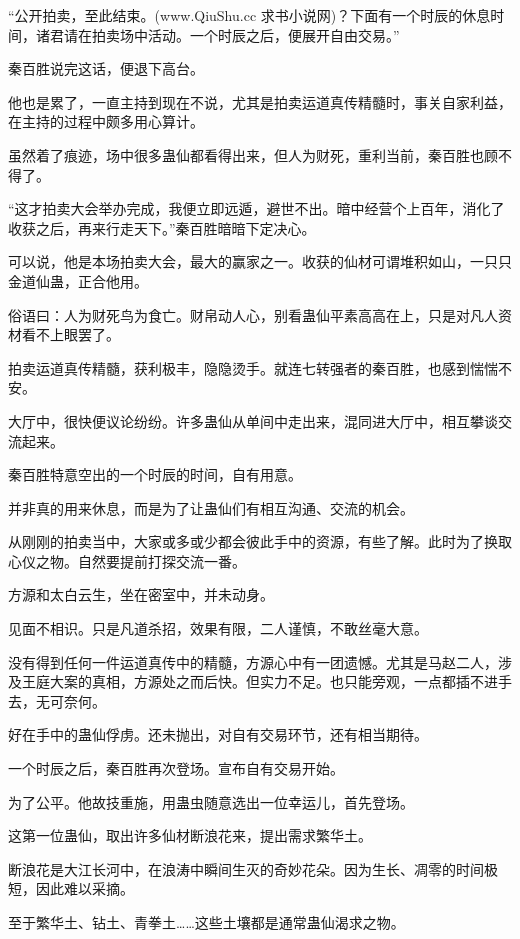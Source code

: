 
\begin{this_body}

“公开拍卖，至此结束。(www.QiuShu.cc 求书小说网)？下面有一个时辰的休息时间，诸君请在拍卖场中活动。一个时辰之后，便展开自由交易。”

秦百胜说完这话，便退下高台。

他也是累了，一直主持到现在不说，尤其是拍卖运道真传精髓时，事关自家利益，在主持的过程中颇多用心算计。

虽然着了痕迹，场中很多蛊仙都看得出来，但人为财死，重利当前，秦百胜也顾不得了。

“这才拍卖大会举办完成，我便立即远遁，避世不出。暗中经营个上百年，消化了收获之后，再来行走天下。”秦百胜暗暗下定决心。

可以说，他是本场拍卖大会，最大的赢家之一。收获的仙材可谓堆积如山，一只只金道仙蛊，正合他用。

俗语曰：人为财死鸟为食亡。财帛动人心，别看蛊仙平素高高在上，只是对凡人资材看不上眼罢了。

拍卖运道真传精髓，获利极丰，隐隐烫手。就连七转强者的秦百胜，也感到惴惴不安。

大厅中，很快便议论纷纷。许多蛊仙从单间中走出来，混同进大厅中，相互攀谈交流起来。

秦百胜特意空出的一个时辰的时间，自有用意。

并非真的用来休息，而是为了让蛊仙们有相互沟通、交流的机会。

从刚刚的拍卖当中，大家或多或少都会彼此手中的资源，有些了解。此时为了换取心仪之物。自然要提前打探交流一番。

方源和太白云生，坐在密室中，并未动身。

见面不相识。只是凡道杀招，效果有限，二人谨慎，不敢丝毫大意。

没有得到任何一件运道真传中的精髓，方源心中有一团遗憾。尤其是马赵二人，涉及王庭大案的真相，方源处之而后快。但实力不足。也只能旁观，一点都插不进手去，无可奈何。

好在手中的蛊仙俘虏。还未抛出，对自有交易环节，还有相当期待。

一个时辰之后，秦百胜再次登场。宣布自有交易开始。

为了公平。他故技重施，用蛊虫随意选出一位幸运儿，首先登场。

这第一位蛊仙，取出许多仙材断浪花来，提出需求繁华土。

断浪花是大江长河中，在浪涛中瞬间生灭的奇妙花朵。因为生长、凋零的时间极短，因此难以采摘。

至于繁华土、钻土、青拳土……这些土壤都是通常蛊仙渴求之物。


\end{this_body}
